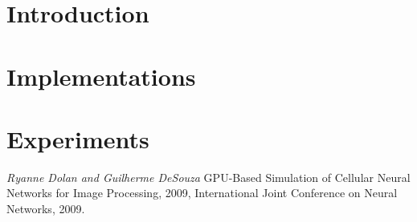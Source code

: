 \documentclass{vskpou} %
\begin{document}
\section{Introduction}




\section{Implementations}



\section{Experiments}



\stranyresume

\begin{thebibliography}{9}

\textit{Ryanne Dolan and Guilherme DeSouza} GPU-Based Simulation of Cellular Neural Networks
for Image Processing, 2009, International Joint Conference on Neural Networks, 2009.



\begin{comment}
Examples


 
\bibitem{Hruby-Kubat} Hrubý,~D., Kubát,~J. \textit{Matematika pro gymnázia: Diferenciální a integrální počet.} 1.\,vydání. Praha: Prometheus, 1997. \ISBN{80-7196-063-2}. Kapitola~6, Určitý integrál, s.\,150--178.

\bibitem{Knuth} Knuth,~D.~E. \textit{The \TeX book.} Reading, Massachusetts: Addison-Wesley, 1984. \ISBN{0-201-13447-0}.

\bibitem{fancy} Moravec, David. Balíček \texttt{fancyhdr.sty}. \textit{Zpravodaj Československého sdružení uživatelů \TeX u} [online]. 2001, roč.\,11, č.\,4, s.\,186--195. \ISSN{1211-6661}. Dostupné z~\url{http://bulletin.cstug.cz/pdf/}.

\bibitem{Mandelbrot} Wikipedia contributors. \textit{Mandelbrot Set} [online]. Wikipedia: The Free Encyclopedia, c2009, datum poslední revize 22.\,10.\,2009 [citováno 22.\,10.\,2009].
\url{http://en.wikipedia.org/wiki/Mandelbrot_set}.

\bibitem{TeX} Přispěvatelé wikipedie. \textit{\TeX} [online]. Wikipedie: Otevřená encyklopedie, c2009, datum poslední revize 7.\,10.\,2009 [citováno 22.\,10.\,2009].
\url{http://cs.wikipedia.org/wiki/TeX}.
\end{comment}
\end{thebibliography}
\end{document}
